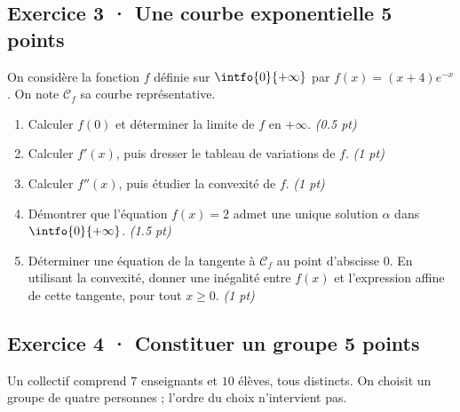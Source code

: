 \mxnewpage{}

\subsection*{Exercice 3 · Une courbe exponentielle \hfill 5 points}On considère la fonction $f$ définie sur $\intfo{0}{+\infty}$ par $f(x)=(x+4)e^{-x}$. On note $\mathcal C_f$ sa courbe représentative.

\begin{enumerate}

\item Calculer $f(0)$ et déterminer la limite de $f$ en $+\infty$. \hfill\textit{(\num{0,5} pt)}

\item Calculer $f' (x)$, puis dresser le tableau de variations de $f$. \hfill\textit{(1 pt)}

\item Calculer $f'' (x)$, puis étudier la convexité de $f$. \hfill\textit{(1 pt)}

\item Démontrer que l'équation $f(x)=2$ admet une unique solution $\alpha$ dans $\intfo{0}{+\infty}$. \hfill\textit{(\num{1,5} pt)}

\item Déterminer une équation de la tangente à $\mathcal C_f$ au point d'abscisse $0$. En utilisant la convexité, donner une inégalité entre $f(x)$ et l'expression affine de cette tangente, pour tout $x\ge0$. \hfill\textit{(1 pt)}

\end{enumerate}

\subsection*{Exercice 4 · Constituer un groupe \hfill 5 points}Un collectif comprend $7$ enseignants et $10$ élèves, tous distincts. On choisit un groupe de quatre personnes ; l'ordre du choix n'intervient pas.

